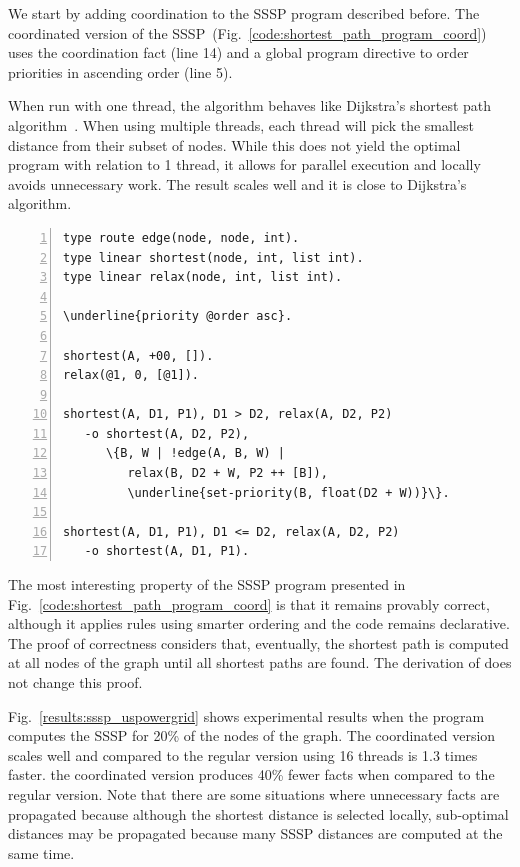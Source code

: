 We start by adding coordination to the SSSP program described before.
The coordinated version of the
SSSP~(Fig.~\ref{code:shortest_path_program_coord}) uses the coordination fact
 (line 14) and a global program directive to order
priorities in ascending order (line 5).

When run with one thread, the algorithm behaves like
Dijkstra's shortest path algorithm~\cite{Dijkstra}. When using multiple
threads, each thread will pick the smallest distance from their subset of nodes.
While this does not yield the optimal program with relation to 1 thread, it
allows for parallel execution and locally avoids unnecessary work. The result
scales well and it is close to Dijkstra's algorithm.

\begin{topfig}
\scriptsize\begin{Verbatim}[numbers=left,commandchars=\\\{\}]
type route edge(node, node, int).
type linear shortest(node, int, list int).
type linear relax(node, int, list int).

\underline{priority @order asc}.

shortest(A, +00, []).
relax(@1, 0, [@1]).

shortest(A, D1, P1), D1 > D2, relax(A, D2, P2)
   -o shortest(A, D2, P2),
      \{B, W | !edge(A, B, W) |
         relax(B, D2 + W, P2 ++ [B]),
         \underline{set-priority(B, float(D2 + W))}\}.

shortest(A, D1, P1), D1 <= D2, relax(A, D2, P2)
   -o shortest(A, D1, P1).
\end{Verbatim}
\end{topfig}
\normalsize

The most interesting property of the SSSP program presented in
Fig.~\ref{code:shortest_path_program_coord} is that it remains provably correct,
although it applies rules using smarter ordering and the code remains
declarative. The proof of correctness considers that, eventually, the shortest
path is computed at all nodes of the graph until all shortest paths are found.
The derivation of  does not change this
proof.

Fig.~\ref{results:sssp_uspowergrid} shows experimental results when
the program computes the SSSP for 20\% of the nodes of the graph.  The
coordinated version scales well and compared to the regular version
using 16 threads is 1.3 times faster.  the coordinated version
produces 40\% fewer facts when compared to the regular version.
Note that there are some situations where unnecessary facts are
propagated because although the shortest distance is selected locally,
sub-optimal distances may be propagated because many SSSP distances
are computed at the same time.

